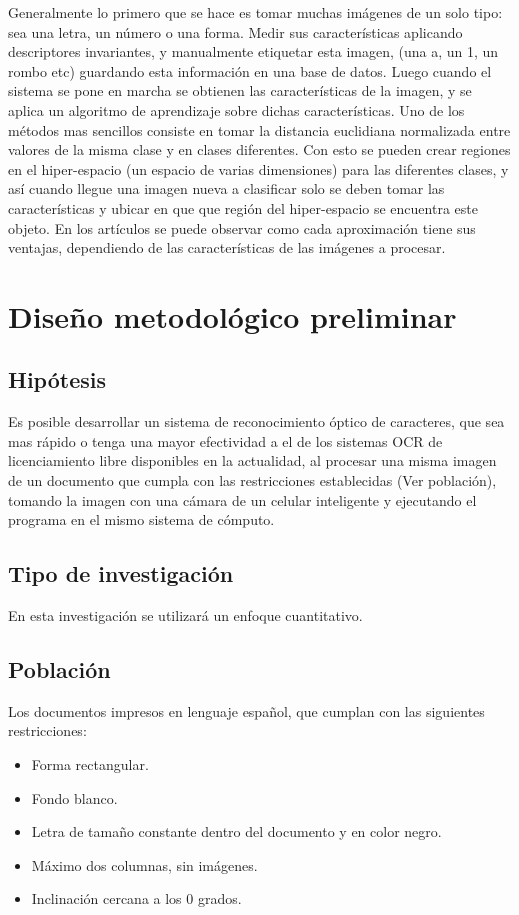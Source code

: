 \documentclass[a4paper, 11pt, oneside]{article}
\begin{document}
	Generalmente lo primero que se hace es tomar muchas imágenes de un solo tipo: sea una letra, un 
	número o una forma. Medir sus características aplicando descriptores invariantes, y manualmente 
    etiquetar esta imagen, (una a, un 1, un rombo etc) guardando esta información en una base de
    datos. Luego cuando el sistema se pone en marcha se obtienen las características de la imagen,
    y se aplica un algoritmo de aprendizaje sobre dichas características. Uno de los métodos mas
	sencillos consiste en tomar la distancia euclidiana normalizada entre valores de la misma
	clase y en clases diferentes. Con esto se pueden crear regiones en el hiper-espacio (un
	espacio de varias dimensiones) para las diferentes clases, y así cuando llegue una imagen
	nueva a clasificar solo se deben tomar las características y ubicar en que que región del
	hiper-espacio se encuentra este objeto. En los artículos se puede observar como  
	cada aproximación tiene sus ventajas, dependiendo de las características de las imágenes a
	procesar.
	\newpage
		
	\section{Diseño metodológico preliminar}
	
	\subsection{Hipótesis}
	Es posible desarrollar un sistema de reconocimiento óptico de caracteres, que sea mas rápido o
	tenga una mayor efectividad a el de los sistemas OCR de licenciamiento libre disponibles
	en la actualidad, al procesar una misma imagen de un documento que cumpla con las restricciones
	establecidas (Ver población), tomando la imagen con una cámara de un celular inteligente y
	ejecutando el programa en el mismo sistema de cómputo.	
	
	\subsection{Tipo de investigación}
	En esta investigación se utilizará un enfoque cuantitativo.
	
	\subsection{Población}
	Los documentos impresos en lenguaje español, que cumplan con las siguientes restricciones:
	\begin{itemize}
	\item Forma rectangular.
	\item Fondo blanco.
	\item Letra de tamaño constante dentro del documento y en color negro.
	\item Máximo dos columnas, sin imágenes.
	\item Inclinación cercana a los 0 grados.
	\end{itemize}
\end{document}
